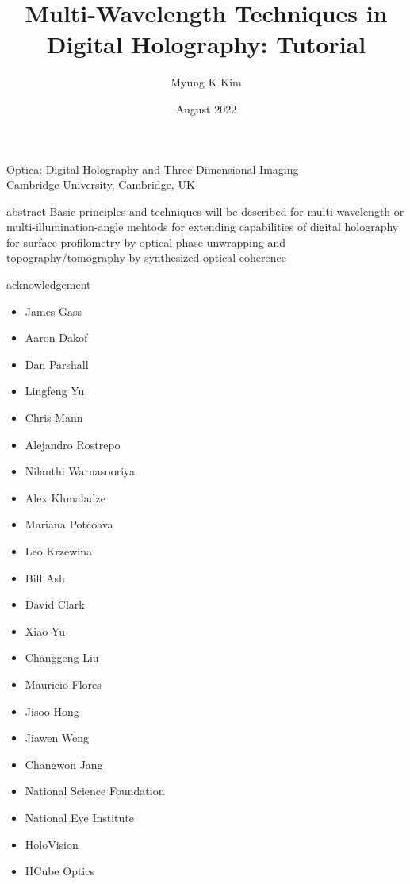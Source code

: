 \documentclass[t, aspectratio=169]{beamer}
\title{Multi-Wavelength Techniques in Digital Holography: Tutorial}
\author{Myung K Kim}
\institute{Dept of Physics, University of South Florida, Tampa, FL USA 33620}
\date{August 2022}
\begin{document}
\begin{frame}
	Optica: Digital Holography and Three-Dimensional Imaging\\
	Cambridge University, Cambridge, UK
	\titlepage
\end{frame}


\begin{frame}{abstract}
\vspace{10 mm}
\centering
Basic principles and techniques will be described for multi-wavelength or multi-illumination-angle mehtods for extending capabilities of digital holography for surface profilometry by optical phase unwrapping and topography/tomography by synthesized optical coherence
\end{frame}


\begin{frame}{acknowledgement}
	\begin{multicols}{2}
		\begin{itemize}
			\item{James Gass}
			\item{Aaron Dakof}
			\item{Dan Parshall}
			\item{Lingfeng Yu}
			\item{Chris Mann}
			\item{Alejandro Rostrepo}
			\item{Nilanthi Warnasooriya}
			\item{Alex Khmaladze}
			\item{Mariana Potcoava}
			\item{Leo Krzewina}
			\item{Bill Ash}
			\item{David Clark}
			\item{Xiao Yu}
			\item{Changgeng Liu}
			\item{Mauricio Flores}
			\item{Jisoo Hong}
			\item{Jiawen Weng}
			\item{Changwon Jang}
			\vspace{5 mm}
			\item{National Science Foundation}
			\item{National Eye Institute}
			\item{HoloVision}
			\item{HCube Optics}
		\end{itemize}
	\end{multicols}
\end{frame}
\end{document}
